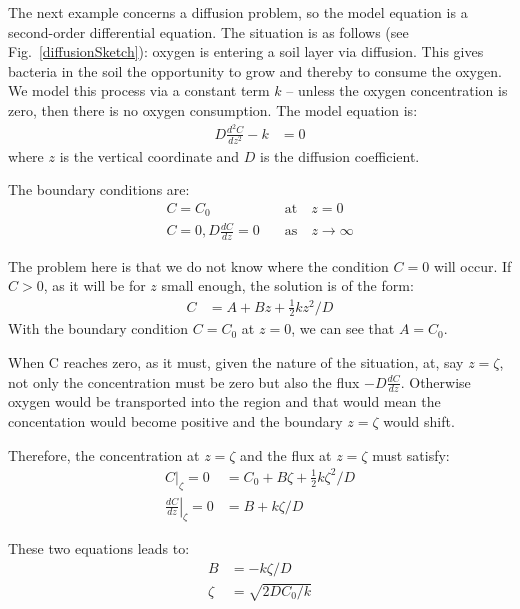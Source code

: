 \documentclass[onecolumn]{article}
\begin{document}
The next example concerns a diffusion problem, so the model equation is a second-order differential
equation. The situation is as follows (see Fig.\ \ref{diffusionSketch}): oxygen is entering a soil layer via diffusion. This gives
bacteria in the soil the opportunity to grow and thereby to consume the oxygen. We model this
process via a constant term $k$ -- unless the oxygen concentration is zero, then there is no oxygen
consumption. The model equation is:
%
\begin{align}
           D \frac{d^2C}{dz^2} - k & = 0
\end{align}
\noindent where $z$ is the vertical coordinate and $D$ is the diffusion coefficient.

The boundary conditions are:
%
\begin{align}
           C = C_0                       & \quad \text{at} \quad z = 0 \\
\nonumber  C = 0, D \frac{dC}{dz} = 0    & \quad \text{as} \quad z \rightarrow \infty
\end{align}

The problem here is that we do not know where the condition $C = 0$ will occur. If $C > 0$, as it will
be for $z$ small enough, the solution is of the form:
%
\begin{align}
\label{solutionOxygen}
           C & = A + Bz + \frac{1}{2} k z^2 / D
\end{align}
With the boundary condition $C = C_0$ at $z = 0$, we can see that $A = C_0$.

When C reaches zero, as it must, given the nature of the situation, at, say $z = \zeta$, not only
the concentration must be zero but also the flux $-D \frac{dC}{dz}$. Otherwise oxygen would be
transported into the region and that would mean the concentation would become positive and the boundary
$z = \zeta$ would shift.

Therefore, the concentration at $z =\zeta$ and the flux at $z = \zeta$ must satisfy:
%
\begin{align}
\label{eqnOxygen}
                    \left.     C \right|_\zeta = 0 &= C_0 + B \zeta + \frac{1}{2} k \zeta^2 / D \\
\nonumber  \left.  \frac{dC}{dz} \right|_\zeta = 0 &=       B       +             k \zeta / D
\end{align}

These two equations leads to:
%
\begin{align}
           B     &= - k \zeta / D \\
\nonumber  \zeta &= \sqrt{2 D C_0 / k}
\end{align}
\end{document}
